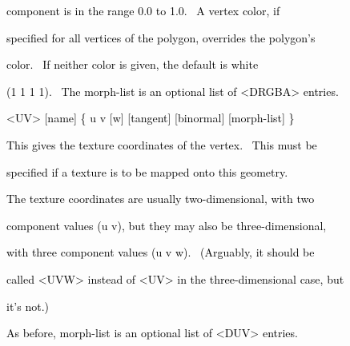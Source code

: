 \documentclass[a4paper]{article}
\newcommand\textstyleOOoComputerKeyWord[1]{\textrm{\textcolor[rgb]{0.0,0.0,0.5019608}{#1}}}
\begin{document}
{\color{black}
\textstyleOOoComputerKeyWord{\textcolor{black}{\ \ \ \ component is in the range 0.0 to 1.0. \ A vertex color, if}}}

{\color{black}
\textstyleOOoComputerKeyWord{\textcolor{black}{\ \ \ \ specified for all vertices of the polygon, overrides the
polygon's}}}

{\color{black}
\textstyleOOoComputerKeyWord{\textcolor{black}{\ \ \ \ color. \ If neither color is given, the default is white}}}

{\color{black}
\textstyleOOoComputerKeyWord{\textcolor{black}{\ \ \ \ (1 1 1 1). \ The morph-list is an optional list of
{\textless}DRGBA{\textgreater} entries.}}}


\bigskip


\bigskip

{\color{black}
\textstyleOOoComputerKeyWord{\textcolor{black}{\ \ \ \ {\textless}UV{\textgreater} [name] \{ u v [w] [tangent]
[binormal] [morph-list] \}}}}


\bigskip

{\color{black}
\textstyleOOoComputerKeyWord{\textcolor{black}{\ \ \ \ This gives the texture coordinates of the vertex. \ This must
be}}}

{\color{black}
\textstyleOOoComputerKeyWord{\textcolor{black}{\ \ \ \ specified if a texture is to be mapped onto this geometry. \ }}}


\bigskip

{\color{black}
\textstyleOOoComputerKeyWord{\textcolor{black}{\ \ \ \ The texture coordinates are usually two-dimensional, with two}}}

{\color{black}
\textstyleOOoComputerKeyWord{\textcolor{black}{\ \ \ \ component values (u v), but they may also be
three-dimensional,}}}

{\color{black}
\textstyleOOoComputerKeyWord{\textcolor{black}{\ \ \ \ with three component values (u v w). \ (Arguably, it should be}}}

{\color{black}
\textstyleOOoComputerKeyWord{\textcolor{black}{\ \ \ \ called {\textless}UVW{\textgreater} instead of
{\textless}UV{\textgreater} in the three-dimensional case, but}}}

{\color{black}
\textstyleOOoComputerKeyWord{\textcolor{black}{\ \ \ \ it's not.)}}}


\bigskip

{\color{black}
\textstyleOOoComputerKeyWord{\textcolor{black}{\ \ \ \ As before, morph-list is an optional list of
{\textless}DUV{\textgreater} entries.}}}
\end{document}
